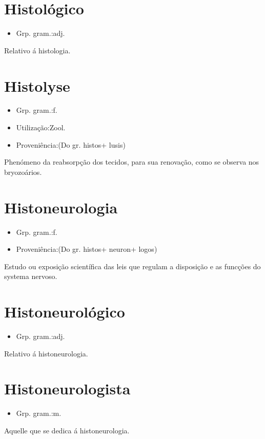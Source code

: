 \documentclass{article}
\begin{document}
\section{Histológico}
\begin{itemize}
\item {Grp. gram.:adj.}
\end{itemize}
Relativo á histologia.
\section{Histolyse}
\begin{itemize}
\item {Grp. gram.:f.}
\end{itemize}
\begin{itemize}
\item {Utilização:Zool.}
\end{itemize}
\begin{itemize}
\item {Proveniência:(Do gr. \textunderscore histos\textunderscore  + \textunderscore lusis\textunderscore )}
\end{itemize}
Phenómeno da reabsorpção dos tecidos, para sua renovação, como se observa nos bryozoários.
\section{Histoneurologia}
\begin{itemize}
\item {Grp. gram.:f.}
\end{itemize}
\begin{itemize}
\item {Proveniência:(Do gr. \textunderscore histos\textunderscore  + \textunderscore neuron\textunderscore  + \textunderscore logos\textunderscore )}
\end{itemize}
Estudo ou exposição scientífica das leis que regulam a disposição e as funcções do systema nervoso.
\section{Histoneurológico}
\begin{itemize}
\item {Grp. gram.:adj.}
\end{itemize}
Relativo á histoneurologia.
\section{Histoneurologista}
\begin{itemize}
\item {Grp. gram.:m.}
\end{itemize}
Aquelle que se dedica á histoneurologia.
\end{document}
